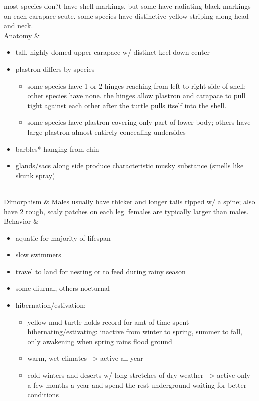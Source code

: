 \begin{center}
\begin{longtabu}
	most species don?t have shell markings, but some have radiating black markings on each carapace scute. some species have distinctive yellow striping along head and neck.
	 \\
	\hline
	Anatomy &
	\begin{itemize}[noitemsep]
		\item tall, highly domed upper carapace w/ distinct keel down center
		\item plastron differs by species
			\begin{itemize}[noitemsep] 
				\item some species have 1 or 2 hinges reaching from left to right side of shell; other species have none. the hinges allow plastron and carapace to pull tight against each other after the turtle pulls itself into the shell.
				\item some species have plastron covering only part of lower body; others have large plastron almost entirely concealing undersides
			\end{itemize}
		\item barbles* hanging from chin
		\item glands/sacs along side produce characteristic musky substance (smells like skunk spray)
	\end{itemize}
	 \\
	\hline
	Dimorphism & 
	Males usually have thicker and longer tails tipped w/ a spine; also have 2 rough, scaly patches on each leg. females are typically larger than males.
	\\
	\hline
	Behavior & 
	\begin{itemize}[noitemsep]
		\item aquatic for majority of lifespan
		\item slow swimmers
		\item travel to land for nesting or to feed during rainy season
		\item some diurnal, others nocturnal
		\item hibernation/estivation:
			\begin{itemize}[noitemsep]
				\item yellow mud turtle holds record for amt of time spent hibernating/estivating: inactive from winter to spring, summer to fall, only awakening when spring rains flood ground
				\item warm, wet climates --> active all year
				\item cold winters and deserts w/ long stretches of dry weather --> active only a few months a year and spend the rest underground waiting for better conditions
			\end{itemize}
		\end{itemize}
				

\end{longtabu}
\end{center}
